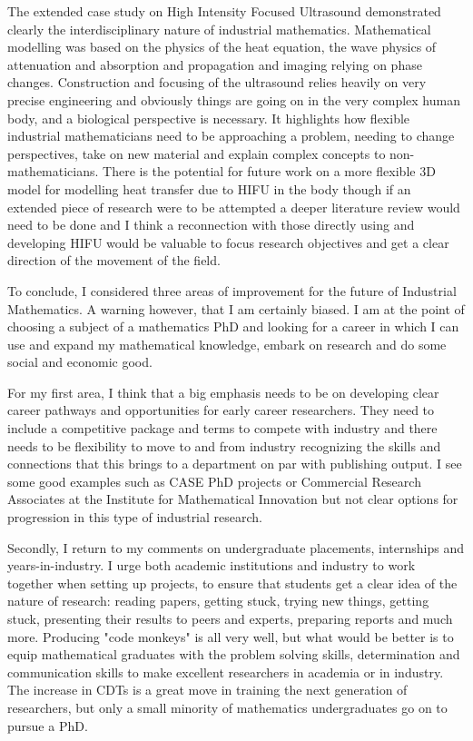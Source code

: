 \documentclass[11pt]{article} %
\begin{document}
The extended case study on High Intensity Focused Ultrasound demonstrated clearly the interdisciplinary nature of industrial mathematics. Mathematical modelling was based on the physics of the heat equation, the  wave physics of attenuation and absorption and propagation and imaging relying on phase changes. Construction and focusing of the ultrasound relies heavily on very precise engineering and obviously things are going on in the very complex human body, and a biological perspective is necessary. It highlights how flexible industrial mathematicians need to be approaching a problem, needing to change perspectives, take on new material and explain complex concepts to non-mathematicians. 
There is the potential for future work on a more flexible 3D model for modelling heat transfer due to HIFU in the body though if an extended piece of research were to be attempted a deeper literature review would need to be done and I think a reconnection with those directly using and developing HIFU would be valuable to focus research objectives and get a clear direction of the movement of the field. 

To conclude, I considered three areas of improvement for the future of Industrial Mathematics. A warning however, that  I am certainly biased. I am at the point of choosing a subject of a mathematics PhD and looking for a career in which I can use and expand my mathematical knowledge, embark on research and do some social and economic good. 

For my first area, I think that a big emphasis needs to be on developing clear career pathways and opportunities for early career researchers. They need to include a competitive package and terms to compete with industry and there needs to be flexibility to move to and from industry recognizing the skills and connections that this brings to a department on par with publishing output. I see some good examples such as CASE PhD projects or  Commercial Research Associates at the Institute for Mathematical Innovation but not clear options for progression in this type of industrial research. 

Secondly, I return to my comments on undergraduate placements, internships and years-in-industry. I urge both academic institutions and industry to work together when setting up projects, to ensure that students get a clear idea of the nature of research: reading papers, getting stuck, trying new things, getting stuck, presenting their results to peers and experts, preparing reports and much more. Producing "code monkeys" is all very well, but what would be better is to equip mathematical graduates with the problem solving skills, determination and communication skills to make excellent researchers in academia or in industry. The increase in CDTs is a great move in training the next generation of researchers, but only a small minority of mathematics undergraduates go on to pursue a PhD. 
\end{document}
